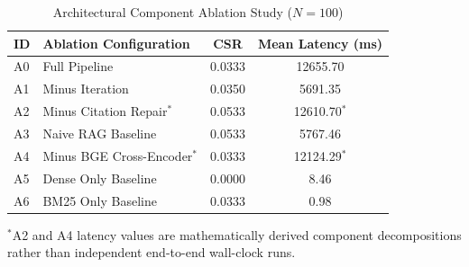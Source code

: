 \begin{table}[t]
\caption{Architectural Component Ablation Study ($N=100$)}
\label{tab:ablation}
\centering
\small
\begin{tabular}{llcc}
\toprule
\textbf{ID} & \textbf{Ablation Configuration} & \textbf{CSR} & \textbf{Mean Latency (ms)} \\
\midrule
A0 & Full Pipeline                         & 0.0333 & 12655.70 \\
A1 & Minus Iteration                       & 0.0350 & 5691.35 \\
A2 & Minus Citation Repair$^*$             & 0.0533 & 12610.70$^*$ \\
A3 & Naive RAG Baseline                    & 0.0533 & 5767.46 \\
A4 & Minus BGE Cross-Encoder$^*$           & 0.0333 & 12124.29$^*$ \\
A5 & Dense Only Baseline                   & 0.0000 & 8.46 \\
A6 & BM25 Only Baseline                    & 0.0333 & 0.98 \\
\bottomrule
\end{tabular}
\vspace{1ex}
\begin{minipage}{\columnwidth}
\footnotesize
$^*$A2 and A4 latency values are mathematically derived component decompositions rather than independent end-to-end wall-clock runs.
\end{minipage}
\end{table}

